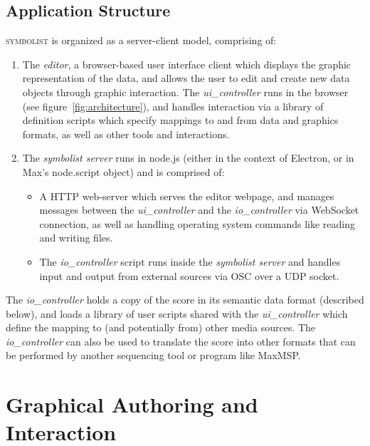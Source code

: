 \documentclass{article}
\def\symbolist{\textsc{symbolist}\xspace}
\def\uicontroller{\textit{ui\_controller}\xspace}
\def\iocontroller{\textit{io\_controller}\xspace}
\begin{document}
\subsection{Application Structure}\label{sec:application_structure}

\symbolist is organized as a server-client model, comprising of:

\begin{enumerate}\itemsep0pt 
\item The \textit{editor}, a browser-based user interface client which displays the graphic representation of the data, and allows the user to edit and create new data objects through graphic interaction. The \uicontroller runs in the browser (see figure~\ref{fig:architecture}), and handles interaction via a library of definition scripts which specify mappings to and from data and graphics formats, as well as other tools and interactions.

\item The \textit{symbolist server} runs in node.js (either in the context of Electron, or in Max's node.script object) and is comprised of: 
\begin{itemize}\itemsep0pt 

\item A HTTP web-server which serves the editor webpage, and manages messages between the \uicontroller and the \iocontroller via WebSocket connection, as well as handling operating system commands like reading and writing files.

\item  The \iocontroller script runs inside the \textit{symbolist server} and handles input and output from external sources via OSC over a UDP socket. 
\end{itemize}
\end{enumerate}

The \iocontroller holds a copy of the score in its semantic data format (described below), and loads a library of user scripts shared with the \uicontroller which define the mapping to (and potentially from) other media sources. The \iocontroller can also be used to translate the score into other formats that can be performed by another sequencing tool or program like MaxMSP.



\section{Graphical Authoring and Interaction}\label{sec:editor} %
\end{document}
